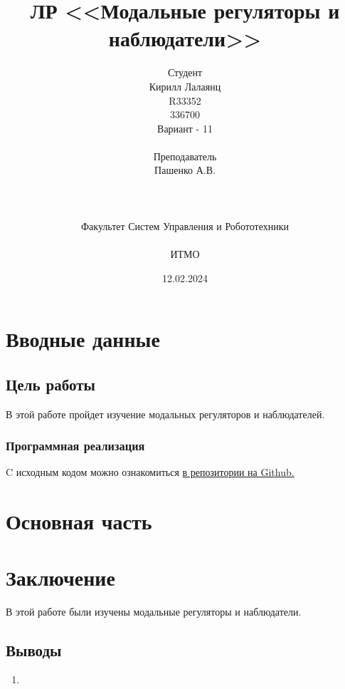 \documentclass[16pt]{article}
\title{ЛР \textnumero 8 <<Модальные регуляторы и наблюдатели>>}
\author{
Студент \\
Кирилл Лалаянц\\
R33352\\
336700\\
Вариант - 11\\
\\
Преподаватель\\
Пашенко А.В. \\
\\
\\
\\
Факультет Систем Управления и Робототехники\\
\\
ИТМО\\
}
\date{12.02.2024}
\begin{document}
\maketitle
\newpage
\tableofcontents
\thispagestyle{empty}

\newpage
\setcounter{page}{1}
\section{Вводные данные}
\subsection{Цель работы}
В этой работе пройдет изучение модальных регуляторов и наблюдателей.


\subsubsection{Программная реализация}
C исходным кодом можно ознакомиться \href{https://github.com/lalayants/control-theory-itmo-2023-2024}{в репозитории на Github.}
\newpage
\section{Основная часть}


\newpage


\newpage



\newpage
\section{Заключение}
В этой работе были изучены модальные регуляторы и наблюдатели.
\subsection{Выводы}
\begin{enumerate}
   \item 
\end{enumerate}
\end{document}
